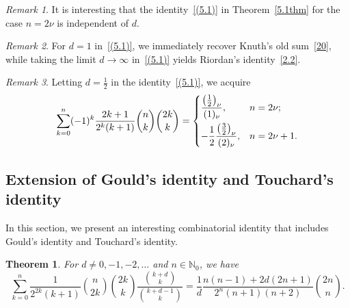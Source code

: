 \documentclass[reqno]{amsart}
\numberwithin{equation}{section}
\theoremstyle{plain}
\newtheorem{thm}{Theorem}[section]
\theoremstyle{remark}
\newtheorem{rem}{Remark}[section]
\begin{document}
\begin{rem}
It is interesting that the identity~\eqref{(5.1)} in Theorem~\ref{5.1thm} for the case \( n=2\nu \) is independent of \( d \).
\end{rem}

\begin{rem}
For \( d=1 \) in~\eqref{(5.1)}, we immediately recover Knuth's old sum~\eqref{20}, while taking the limit \( d \to \infty \) in~\eqref{(5.1)} yields Riordan's identity~\eqref{2.2}.
\end{rem}

\begin{rem}
Letting \( d=\tfrac{1}{2} \) in the identity~\eqref{(5.1)}, we acquire
\[
\sum_{k=0}^{n} (-1)^k\frac{2k+1}{2^k (k+1)}\binom{n}{k}\binom{2k}{k}
=
\begin{dcases}
\frac{\bigl(\frac12\bigr)_\nu}{(1)_\nu}, & n=2\nu; \\
-\frac{1}{2}\frac{\bigl(\frac32\bigr)_\nu}{(2)_\nu}, & n=2\nu+1.
\end{dcases}
\]
\end{rem}

\subsection{Extension of Gould's identity and Touchard's identity}

In this section, we present an interesting combinatorial identity that
includes Gould's identity and Touchard's identity.

\begin{thm}\label{5.2thm}
For $d \neq 0,-1,-2,\dotsc$ and $n\in\mathbb{N}_0$, we have
\begin{equation}\label{5.2}
\sum_{k=0}^{n}\frac{1}{2^{2k}(k+1)}\binom{n}{2k}\binom{2k}{k}\frac{\binom{k+d}{k}}{\binom{k+d-1}{k}}
=\frac{1}{d}\frac{n(n-1)+2d(2n+1)}{2^{n}(n+1)(n+2)}\binom{2n}{n}.
\end{equation}
\end{thm}
\end{document}

